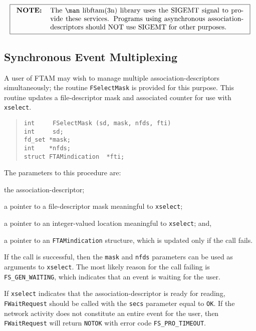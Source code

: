\[\fbox{\begin{tabular}{lp{0.8\textwidth}}
\bf NOTE:&	The \man libftam(3n) library uses the SIGEMT signal to provide
		these services.
		Programs using asynchronous association-descriptors should NOT
		use SIGEMT for other purposes.
\end{tabular}}\]

\subsection	{Synchronous Event Multiplexing}
A user of FTAM may wish to manage multiple
association-descriptors simultaneously;
the routine \verb"FSelectMask" is provided for this purpose.
This routine updates a file-descriptor mask and associated counter for use
with \verb"xselect".
\begin{quote}\small\begin{verbatim}
int     FSelectMask (sd, mask, nfds, fti)
int     sd;
fd_set *mask;
int    *nfds;
struct FTAMindication  *fti;
\end{verbatim}\end{quote}
The parameters to this procedure are:
\begin{describe}
\item[\verb"sd":] the association-descriptor;

\item[\verb"mask":] a pointer to a file-descriptor mask meaningful to
\verb"xselect";

\item[\verb"nfds":] a pointer to an integer-valued location meaningful to
\verb"xselect";
and,

\item[\verb"fti":] a pointer to an \verb"FTAMindication" structure, which is updated
only if the call fails.
\end{describe}
If the call is successful, then the \verb"mask" and \verb"nfds" parameters can
be used as arguments to \verb"xselect".
The most likely reason for the call failing is \verb"FS_GEN_WAITING",
which indicates that an event is waiting for the user.

If \verb"xselect" indicates that the association-descriptor is ready for
reading,
\verb"FWaitRequest" should be called with the \verb"secs" parameter equal to
\verb"OK".
If the network activity does not constitute an entire event for the user,
then \verb"FWaitRequest" will return \verb"NOTOK" with error code
\verb"FS_PRO_TIMEOUT".

